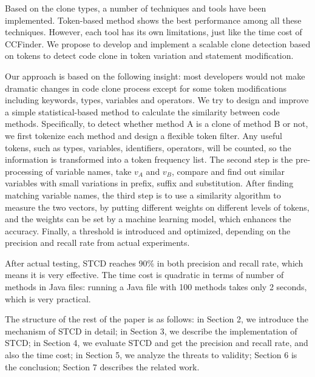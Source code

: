 \documentclass[../main.tex]{subfiles}
\begin{document}


Based on the clone types, a number of techniques and tools have been implemented. Token-based method shows the best performance among all these techniques. However, each tool has its own limitations, just like the time cost of CCFinder. We propose to develop and implement a scalable clone detection based on tokens to detect code clone in token variation and statement modification.

Our approach is based on the following insight: most developers would not make dramatic changes in code clone process except for some token modifications including keywords, types, variables and operators. 
We try to design and improve a simple statistical-based method to calculate the similarity between code methods. 
Specifically, to detect whether method A is a clone of method B or not, we first tokenize each method and design a flexible token filter. Any useful tokens, such as types, variables, identifiers, operators, will be counted, so the information is transformed into a token frequency list. 
The second step is the pre-processing of variable names, take $v_A$ and $v_B$, compare and find out similar variables with small variations in prefix, suffix and substitution. 
After finding matching variable names, the third step is to use a similarity algorithm to measure the two vectors, by putting different weights on different levels of tokens, and the weights can be set by a machine learning model, which enhances the accuracy.
Finally, a threshold is introduced and optimized, depending on the precision and recall rate from actual experiments.

After actual testing, STCD reaches 90\% in both precision and recall rate, which means it is very effective. The time cost is quadratic in terms of number of methods in Java files: running a Java file with 100 methods takes only 2 seconds, which is very practical.

The structure of the rest of the paper is as follows: in Section 2, we introduce the mechanism of STCD in detail; in Section 3, we describe the implementation of STCD; in Section 4, we evaluate STCD and get the precision and recall rate, and also the time cost; in Section 5, we analyze the threats to validity; Section 6 is the conclusion; Section 7 describes the related work.

%

\end{document}
